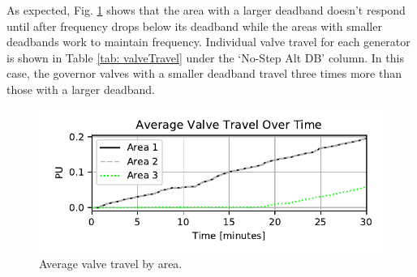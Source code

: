 As expected, Fig. \ref{fig: areaValveTravel} shows that the area with a larger deadband doesn't respond until after frequency drops below its deadband while the areas with smaller deadbands work to maintain frequency. 
Individual valve travel for each generator is shown in Table \ref{tab: valveTravel} under the `No-Step Alt DB' column.
In this case, the governor valves with a smaller deadband travel three times more than those with a larger deadband.

\begin{figure}[!ht]
\centering
\includegraphics[width=\linewidth]{figures/miniWECCuniAccVTOverTime}
\caption{Average valve travel by area.}
\label{fig: areaValveTravel}
\end{figure}